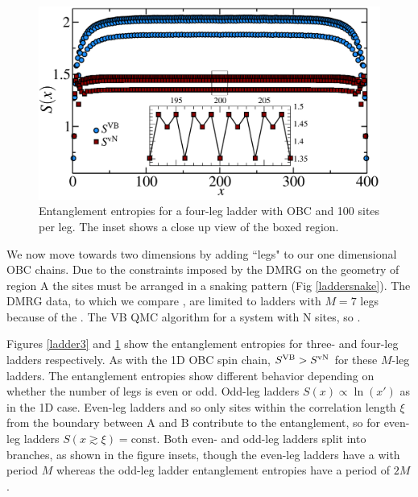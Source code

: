  \begin{figure} { \includegraphics[width=6in]{./figures/paper1/figure3/4-leg-ladder/4legfig.pdf}
\caption[Entanglement entropies for a four-leg ladder]{
Entanglement entropies for a four-leg ladder with OBC and 100 sites per leg.  
The inset shows a close up view of the boxed region.  
 \label{ladder4} }} 
 \end{figure}
 
 We now move towards two dimensions by adding ``legs" to our one dimensional OBC chains.
 Due to the constraints imposed by the DMRG on the geometry of region A the sites must be arranged in a snaking pattern (Fig \ref{laddersnake}).
The DMRG data, to which we compare \vB, are limited to ladders with $M=7$ legs because of the .
 The VB QMC algorithm  for a system with N sites, so .
 
 Figures \ref{ladder3} and \ref{ladder4} show the entanglement entropies for three- and four-leg ladders respectively.
 As with the 1D OBC spin chain, $S^{\text{VB}} > S^{\text{vN}}$ for these $M$-leg ladders.
 The entanglement entropies show different behavior depending on whether the number of legs is even or odd.
 Odd-leg ladders 
 $S(x) \propto \ln(x')$ as in the 1D case.
 Even-leg ladders  and so only sites within the correlation length $\xi$ from the boundary between A and B contribute to the entanglement,
so for even-leg ladders $S(x\gtrsim\xi) = \text{const}$.
Both even- and odd-leg ladders split into branches, as shown in the figure insets, though the even-leg ladders have a  with period $M$ whereas the odd-leg ladder entanglement entropies have a period of $2M$.  
 
